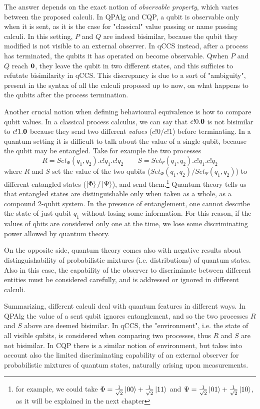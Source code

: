 The answer depends on the exact notion of \textit{observable property}, which varies between the proposed calculi. In QPAlg and CQP, a qubit is observable only when it is sent, as it is the case for "classical" value passing or name passing calculi. In this setting, $P$ and $Q$ are indeed bisimilar, because the qubit they modified is not visible to an external observer. In qCCS instead, after a process has terminated, the qubits it has operated on become observable. Qwhen $P$ and $Q$ reach $\mathbf{0}$, they leave the qubit in two different states, and this sufficies to refutate bisimilarity in qCCS. This discrepancy is due to a sort of "ambiguity", present in the syntax of all the calculi proposed up to now, on what happens to the qubits after the process termination.
 
 Another crucial notion when defining behavioural equivalence is how to compare qubit values. In a classical process calculus, we can say that $c!0.\mathbf{0}$ is not bisimilar to $c!1.\mathbf{0}$ because they send two different \textit{values} ($c!0 / c!1$) before terminating. In a quantum setting it is difficult to talk about the value of a single qubit, because the qubit may be entangled.  Take for example the two processes 
 \[R = Set_{\Phi}(q_1, q_2).c!q_1.c!q_2 \qquad 
   S = Set_{\Psi}(q_1, q_2).c!q_1.c!q_2\]
where $R$ and $S$ set the value of the two qubits ($Set_{\Phi}(q_1, q_2) / Set_{\Psi}(q_1, q_2)$) to different entangled states ($\ket{\Phi} / \ket{\Psi}$), and send them.\footnote{for example, we could take $\Phi = \frac{1}{\sqrt{2}}\ket{00} + \frac{1}{\sqrt{2}}\ket{11}$ and $\Psi = \frac{1}{\sqrt{2}}\ket{01} + \frac{1}{\sqrt{2}}\ket{10}$, as it will be explained in the next chapter} 
Quantum theory tells us that entangled states are distinguishable only when taken as a whole, as a compound 2-qubit system. In the presence of entanglement, one cannot describe the state of just qubit $q_1$ without losing some information. For this reason, if the values of qbits are considered only one at the time, we lose some discriminating power allowed by quantum theory.

On the opposite side, quantum theory comes also with negative results about distinguishability of probabilistic mixtures (i.e. distributions) of quantum states. Also in this case, the capability of the observer to discriminate between different entities must be considered carefully, and is addressed or ignored in different calculi.
 
Summarizing, different calculi deal with quantum features in different ways. In QPAlg the value of a sent qubit ignores entanglement, and so the two processes $R$ and $S$ above are deemed bisimilar. In qCCS, the "environment", i.e. the state of all visible qubits, is considered when comparing two processes, thus $R$ and $S$ are not bisimilar. In CQP there is a similar notion of environment, but takes into account also the limited discriminating capability of an external observer for probabilistic mixtures of quantum states, naturally arising upon measurements.
 
